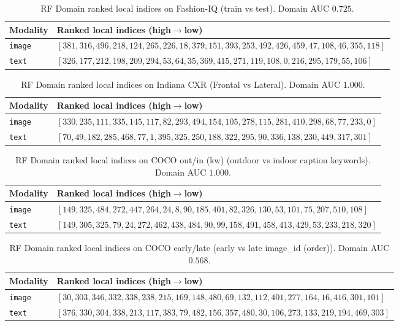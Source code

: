 \begin{table}[ht]
\centering
\caption{RF Domain ranked local indices on Fashion-IQ (train vs test). Domain AUC $0.725$.}
\label{tab:mm-fsds-fashion_iq-rf}
\small
\begin{tabular}{@{}l p{11.2cm}@{}}
\toprule
Modality & Ranked local indices (high$\to$low) \\
\midrule
\texttt{image} & $[381,316,496,218,124,265,226,18,379,151,393,253,492,426,459,47,108,46,355,118]$ \\
\texttt{text} & $[326,177,212,198,209,294,53,64,35,369,415,271,119,108,0,216,295,179,55,106]$ \\
\bottomrule
\end{tabular}
\end{table}

\begin{table}[ht]
\centering
\caption{RF Domain ranked local indices on Indiana CXR (Frontal vs Lateral). Domain AUC $1.000$.}
\label{tab:mm-fsds-indiana_cxr-rf}
\small
\begin{tabular}{@{}l p{11.2cm}@{}}
\toprule
Modality & Ranked local indices (high$\to$low) \\
\midrule
\texttt{image} & $[330,235,111,335,145,117,82,293,494,154,105,278,115,281,410,298,68,77,233,0]$ \\
\texttt{text} & $[70,49,182,285,468,77,1,395,325,250,188,322,295,90,336,138,230,449,317,301]$ \\
\bottomrule
\end{tabular}
\end{table}

\begin{table}[ht]
\centering
\caption{RF Domain ranked local indices on COCO out/in (kw) (outdoor vs indoor caption keywords). Domain AUC $1.000$.}
\label{tab:mm-fsds-coco_outdoor_indoor-rf}
\small
\begin{tabular}{@{}l p{11.2cm}@{}}
\toprule
Modality & Ranked local indices (high$\to$low) \\
\midrule
\texttt{image} & $[149,325,484,272,447,264,24,8,90,185,401,82,326,130,53,101,75,207,510,108]$ \\
\texttt{text} & $[149,305,325,79,24,272,462,438,484,90,99,158,491,458,413,429,53,233,218,320]$ \\
\bottomrule
\end{tabular}
\end{table}

\begin{table}[ht]
\centering
\caption{RF Domain ranked local indices on COCO early/late (early vs late image_id (order)). Domain AUC $0.568$.}
\label{tab:mm-fsds-coco_time_order-rf}
\small
\begin{tabular}{@{}l p{11.2cm}@{}}
\toprule
Modality & Ranked local indices (high$\to$low) \\
\midrule
\texttt{image} & $[30,303,346,332,338,238,215,169,148,480,69,132,112,401,277,164,16,416,301,101]$ \\
\texttt{text} & $[376,330,304,338,213,117,383,79,482,156,357,480,30,106,273,133,219,194,469,303]$ \\
\bottomrule
\end{tabular}
\end{table}

